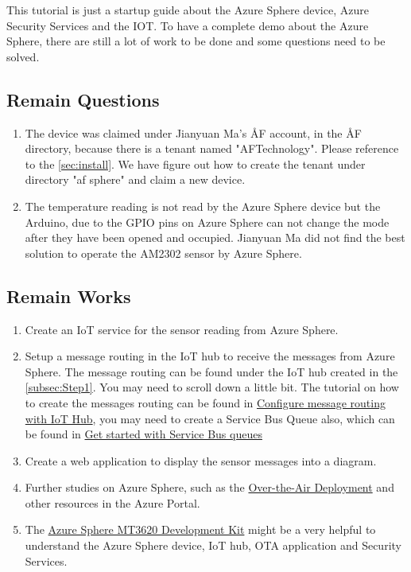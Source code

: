 This tutorial is just a startup guide about the Azure Sphere device, Azure Security Services and the IOT. To have a complete demo 
about the Azure Sphere, there are still a lot of work to be done and some questions need to be solved.

\subsection{Remain Questions}
\begin{enumerate}
    \item The device was claimed under Jianyuan Ma's ÅF account, in the ÅF directory, because there is a tenant named "AFTechnology". 
          Please reference to the \ref{sec:install}. We have figure out how to create the tenant under directory "af sphere" and claim 
          a new device.
    \item The temperature reading is not read by the Azure Sphere device but the Arduino, due to the GPIO pins on Azure Sphere can not 
          change the mode after they have been opened and occupied. Jianyuan Ma did not find the best solution to operate the AM2302 
          sensor by Azure Sphere. 
\end{enumerate}

\subsection{Remain Works}
\begin{enumerate}
    \item Create an IoT service for the sensor reading from Azure Sphere.
    \item Setup a message routing in the IoT hub to receive the messages from Azure Sphere. The message routing can be found under the 
          IoT hub created in the \ref{subsec:Step1}. You may need to scroll down a little bit. The tutorial on how to create the messages
          routing can be found in \href{https://docs.microsoft.com/en-us/azure/iot-hub/tutorial-routing}{Configure message routing with IoT Hub}, 
          you may need to create a Service Bus Queue also, which can be found in \href{https://docs.microsoft.com/en-us/azure/service-bus-messaging/service-bus-dotnet-get-started-with-queues}{Get started with Service Bus queues}
    \item Create a web application to display the sensor messages into a diagram.
    \item Further studies on Azure Sphere, such as the \href{https://docs.microsoft.com/en-us/azure-sphere/deployment/deployment-overview}{Over-the-Air Deployment} and 
          other resources in the Azure Portal.
    \item The \href{http://wiki.seeedstudio.com/Azure_Sphere_MT3620_Development_Kit/}{Azure Sphere MT3620 Development Kit} might be a 
          very helpful to understand the Azure Sphere device, IoT hub, OTA application and Security Services.
\end{enumerate}